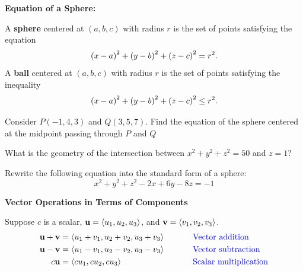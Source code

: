 \documentclass[mathNotesPreamble]{subfiles}
\begin{document}
  \textbf{Equation of a Sphere:}
  \begin{defn*}
    A \textbf{sphere} centered at $(a,b,c)$ with radius $r$ is the set of points satisfying the equation
      \[{\left(x-a\right)}^2+{\left(y-b\right)}^2+{\left(z-c\right)}^2=r^2.\]
    A \textbf{ball} centered at $(a,b,c)$ with radius $r$ is the set of points satisfying the inequality
      \[{\left(x-a\right)}^2+{\left(y-b\right)}^2+{\left(z-c\right)}^2\leq r^2.\]
  \end{defn*}

  \begin{ex*}
    Consider $P(-1,4,3)$ and $Q(3,5,7)$. Find the equation of the sphere centered at the midpoint passing through $P$ and $Q$
  \end{ex*}

  \begin{ex*}
    What is the geometry of the intersection between $x^2+y^2+z^2=50$ and $z=1$?
  \end{ex*}
  \pagebreak

  \begin{ex*}
    Rewrite the following equation into the standard form of a sphere:
      \[x^2+y^2+z^2-2x+6y-8z=-1\]
  \end{ex*}
  \pagebreak
  
  \textbf{Vector Operations in Terms of Components}
    \begin{defn*}
      Suppose $c$ is a scalar, ${\mathbf{u}}={\left\langle u_1,u_2,u_3 \right\rangle}$, and ${\mathbf{v}}={\left\langle v_1,v_2,v_3 \right\rangle}$.
        \begin{alignat*}{2}
          {\mathbf{u}}+{\mathbf{v}}&={\left\langle u_1+v_1,u_2+v_2,u_3+v_3 \right\rangle}&\hspace*{25pt}& \textnormal{\textcolor{blue}{ Vector addition}}\\
          {\mathbf{u}}-{\mathbf{v}}&={\left\langle u_1-v_1,u_2-v_2,u_3-v_3 \right\rangle}&& \textnormal{\textcolor{blue}{ Vector subtraction}}\\
          c{\mathbf{u}}&={\left\langle cu_1,cu_2,cu_3 \right\rangle}&& \textnormal{\textcolor{blue}{ Scalar multiplication}}
        \end{alignat*}
    \end{defn*}
\end{document}
